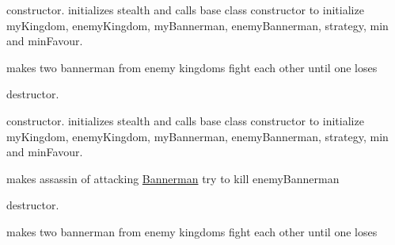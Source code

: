 
\begin{DoxyRefList}
\item[Member \mbox{\hyperlink{class_ambush_a31fe32d8eba8effd01382376f9aff1e0}{Ambush\+::Ambush}} (int stealth, int min, int min\+Favour)]\label{todo__todo000001}%
%
constructor. initializes stealth and calls base class constructor to initialize my\+Kingdom, enemy\+Kingdom, my\+Bannerman, enemy\+Bannerman, strategy, min and min\+Favour.  
\item[Member \mbox{\hyperlink{class_ambush_a51193e1b97edc379fb3c79918132ea15}{Ambush\+::attack}} (\mbox{\hyperlink{class_bannerman}{Bannerman}} $\ast$my\+Bannerman, \mbox{\hyperlink{class_bannerman}{Bannerman}} $\ast$enemy\+Bannerman)]\label{todo__todo000002}%
%
makes two bannerman from enemy kingdoms fight each other until one loses  
\item[Member \mbox{\hyperlink{class_ambush_a36a5798e6b3b4493e5e1c925d57d6a39}{Ambush\+::$\sim$\+Ambush}} ()]\label{todo__todo000003}%
%
destructor.  
\item[Member \mbox{\hyperlink{class_assassinate_ae4a924a40a5433112ff206bc3becff90}{Assassinate\+::Assassinate}} (int stealth, bool alive, int min, int min\+Favour)]\label{todo__todo000004}%
%
constructor. initializes stealth and calls base class constructor to initialize my\+Kingdom, enemy\+Kingdom, my\+Bannerman, enemy\+Bannerman, strategy, min and min\+Favour.  
\item[Member \mbox{\hyperlink{class_assassinate_aa650bb6fb68529914922728d6cc9cb07}{Assassinate\+::attack}} (\mbox{\hyperlink{class_bannerman}{Bannerman}} $\ast$my\+Bannerman, \mbox{\hyperlink{class_bannerman}{Bannerman}} $\ast$enemy\+Bannerman)]\label{todo__todo000005}%
%
makes assassin of attacking \mbox{\hyperlink{class_bannerman}{Bannerman}} try to kill enemy\+Bannerman  
\item[Member \mbox{\hyperlink{class_assassinate_a3f7d6fa4b38fb46cb63fbcc9509c0730}{Assassinate\+::$\sim$\+Assassinate}} ()]\label{todo__todo000006}%
%
destructor.  
\item[Member \mbox{\hyperlink{class_battle_field_a0a0ea58914a59f8d385041f454ffe6d0}{Battle\+Field\+::attack}} (\mbox{\hyperlink{class_bannerman}{Bannerman}} $\ast$my\+Bannerman, \mbox{\hyperlink{class_bannerman}{Bannerman}} $\ast$enemy\+Bannerman)]\label{todo__todo000008}%
%
makes two bannerman from enemy kingdoms fight each other until one loses  

\end{DoxyRefList}

